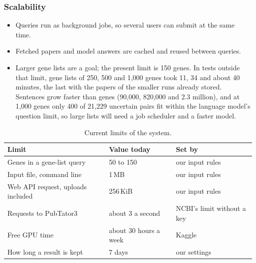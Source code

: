 \documentclass[11pt,a4paper]{article}
\begin{document}
\subsubsection{Scalability}
\begin{itemize}
  \item Queries run as background jobs, so several users can submit at the same time.
  \item Fetched papers and model answers are cached and reused between queries.
  \item Larger gene lists are a goal; the present limit is 150 genes. In tests outside that
    limit, gene lists of 250, 500 and 1,000 genes took 11, 34 and about 40 minutes, the last with
    the papers of the smaller runs already stored. Sentences grow faster than genes (90,000,
    820,000 and 2.3 million), and at 1,000 genes only 400 of 21,229 uncertain pairs fit within the
    language model's question limit, so large lists will need a job scheduler and a faster model.
\end{itemize}

\begin{table}[htbp]
\centering
\small
\begin{tabular}{@{}lll@{}}
\toprule
\textbf{Limit} & \textbf{Value today} & \textbf{Set by}\\
\midrule
Genes in a gene-list query & 50 to 150 & our input rules\\
Input file, command line & 1\,MB & our input rules\\
Web API request, uploads included & 256\,KiB & our input rules\\
Requests to PubTator3 & about 3 a second & NCBI's limit without a key\\
Free GPU time & about 30 hours a week & Kaggle\\
How long a result is kept & 7 days & our settings\\
\bottomrule
\end{tabular}
\caption{Current limits of the system.}
\label{tab:limits}
\end{table}

\end{document}
